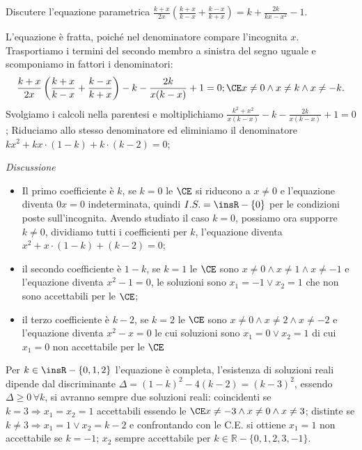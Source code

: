 \begin{exrig}
\begin{esempio}
Discutere l'equazione parametrica $\frac{k + x}{2 x} \left( \frac{k + x}{k - x} + \frac{k - x}{k + x} \right)=k + \frac{2 k}{k x - x^{2}} - 1$.

L’equazione è fratta, poiché nel denominatore compare l’incognita $x$. Trasportiamo i termini del secondo membro a sinistra del segno uguale e scomponiamo in fattori i denominatori: 
\[\frac{k + x}{2 x} \left( \frac{k + x}{k - x} + \frac{k - x}{k +x} \right) - k - \frac{2 k}{x ( k - x )} + 1=0; \CE x \neq 0 \wedge x \neq k \wedge x \neq - k.\]
Svolgiamo i calcoli nella parentesi e moltiplichiamo $\frac{k^{2} + x^{2}}{x ( k - x )} - k - \frac{2 k}{x ( k - x )} + 1=0$;
Riduciamo allo stesso denominatore ed eliminiamo il denominatore $k x^{2} + k x \cdot ( 1 - k ) + k \cdot ( k - 2 )=0$;

\emph{Discussione}
\begin{itemize}
 \item Il primo coefficiente è $k$, se $k = 0$ le $\CE$ si riducono a $x \neq 0$ e l’equazione diventa $0x = 0$ indeterminata, quindi $I.S. = \insR - \{ 0\}$ per le condizioni poste sull’incognita. Avendo studiato il caso $k=0$, possiamo ora supporre $k \neq 0$, dividiamo tutti i coefficienti per $k$, l’equazione diventa $x^{2} + x \cdot ( 1 - k ) + ( k - 2 )=0$;
 \item il secondo coefficiente è $1-k$, se $k = 1$ le $\CE$ sono $x \neq 0 \wedge x \neq 1 \wedge x \neq - 1$ e l’equazione diventa $x^{2} - 1 = 0$, le soluzioni sono $x_{1} = -1 \vee x_{2} = 1$ che non sono accettabili per le $\CE$;
 \item il terzo coefficiente è $k-2$, se $k = 2$ le $\CE$ sono $x \neq 0 \wedge x \neq 2 \wedge x \neq - 2$ e l’equazione diventa $x^{2} - x = 0$ le cui soluzioni sono $x_{1} = 0 \vee x_{2} = 1$ di cui $x_{1} = 0$ non accettabile per le $\CE$
\end{itemize}
Per $k \in \insR - \{0, 1, 2\}$ l’equazione è completa, l’esistenza di soluzioni reali dipende dal discriminante $\Delta = (1 - k)^{2}-4(k-2)=(k-3)^{2}$, essendo
$\Delta \geq 0\, \forall k$, si avranno sempre due soluzioni reali: coincidenti se $k = 3 \Rightarrow x_{1} = x_{2} = 1$ accettabili essendo le
$\CE x \neq - 3 \wedge x \neq 0 \wedge x \neq 3$; distinte se $k \neq 3 \Rightarrow x_{1} = 1 \vee x_{2} = k - 2$ e confrontando con le C.E. si ottiene $x_{1} = 1$
non accettabile se $k = - 1$; $x_{2}$ sempre accettabile per $k \in \mathbb{R} - \{ 0,1,2,3, - 1 \}$.


\end{esempio}
\end{exrig}
